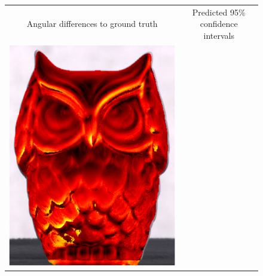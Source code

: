 \begin{figure}[t]
    \centering
    \begin{minipage}{0.5\linewidth}
    \newcommand{\customwidthres}{0.45\linewidth}
    \begin{tabular}{cc}
        \scriptsize Angular differences to ground truth & \scriptsize Predicted 95\% confidence intervals \\
        \includegraphics[width=\customwidthres]{./figures/reconstruction/owl_delta_gt.png} &

\end{tabular}
\end{minipage}
\end{figure}
